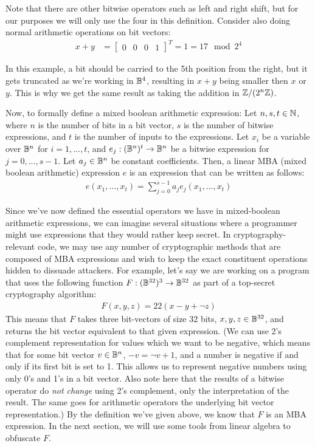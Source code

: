 Note that there are other bitwise operators such as left and right shift, but for our
purposes we will only use the four in this definition. Consider also doing normal arithmetic operations on bit vectors:
\begin{align*}
x + y &= \begin{bmatrix}
0 & 0 & 0 & 1
\end{bmatrix}^T = 1 = 17 \mod 2^4
\end{align*}
\par In this example, a bit should be carried to
the 5th position from the right, but it gets truncated as we're working in $\mathbb{B}^4$, resulting
in $x + y$ being smaller then $x$ or $y$.
This is why we get the same result as taking the addition in
$\mathbb{Z}/(2^n\mathbb{Z})$.
\par Now, to formally define a mixed boolean arithmetic expression:
 {Let $n,s,t \in \mathbb{N}$, where $n$ is the number of bits in a bit vector,
$s$ is the number of bitwise expressions, and $t$ is the number of
inputs to the expressions.
Let $x_i$ be a variable over $\mathbb{B}^n$ for
$i = 1,...,t$, and $e_j : (\mathbb{B}^n)^t \rightarrow \mathbb{B}^n$ be a bitwise expression for
$j = 0,...,s-1$. Let $a_j\in \mathbb{B}^n$ be constant coefficients.
Then, a linear MBA (mixed boolean arithmetic) expression $e$ is an expression that can be written as follows:
\begin{align*}
    e(x_1, ..., x_t) = \sum_{j=0}^{s-1} a_j e_j(x_1,...,x_t)
\end{align*}
}
\par Since we've now defined the essential operators we have in mixed-boolean
arithmetic
expressions, we can imagine several situations where a programmer might use expressions
that they would rather keep secret. In cryptography-relevant code, we may use any
number of cryptographic methods that are composed of MBA
expressions
and wish to keep the exact constituent operations hidden
to dissuade attackers. For example, let's say we are working on a
program that uses the following function $F : (\mathbb{B}^{32})^3 \rightarrow \mathbb{B}^{32}$ as part
of a top-secret cryptography algorithm:
\begin{align*}
    F(x, y, z) = 22(x - y + \neg z)
\end{align*}
This means  that $F$ takes three bit-vectors of size 32 bits, $x, y, z \in \mathbb{B}^{32}$,
and returns the bit vector equivalent to that given expression.
(We can use 2's complement representation for values which we want to be negative,
which means that for some bit vector $v \in \mathbb{B}^n$, $-v = \neg v + 1$,
and a number is negative if and only if its first bit is set to 1.
This allows us to represent negative numbers using only 0's and 1's in a bit vector.
Also note here that the results of a bitwise operator do {\itshape not change}
using 2's complement, only the  interpretation of the result. The same goes for
arithmetic operators the underlying bit vector representation.)
By the definition we've given above, we know that $F$ is an MBA expression.
In the next section,
we will use some tools from linear algebra to obfuscate $F$.
